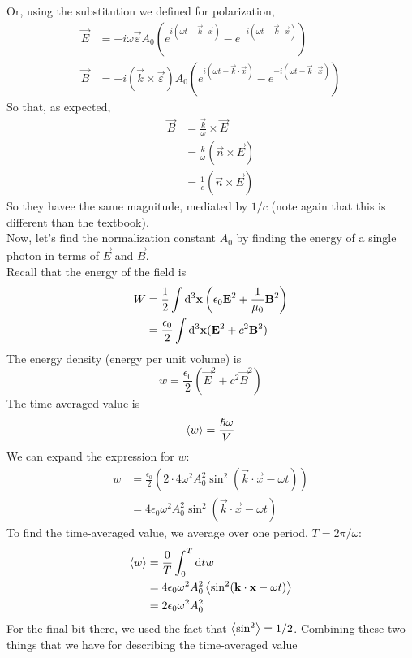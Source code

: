 \documentclass[a4paper]{article}
\begin{document}
Or, using the substitution we defined for polarization,
\begin{align*}
	\vec{E} &= -i\omega\vec{\varepsilon}A_0
	\left(
		e^{ i(\omega t-\vec{k}\cdot\vec{x})} -
		e^{-i(\omega t-\vec{k}\cdot\vec{x})}
	\right)\\
	\vec{B} &= -i(\vec{k}\times\vec{\varepsilon})A_0
	\left(
		e^{ i(\omega t-\vec{k}\cdot\vec{x})} -
		e^{-i(\omega t-\vec{k}\cdot\vec{x})}
	\right)
\end{align*}
So that, as expected,
\begin{align*}
	\vec{B} &= \frac{\vec{k}}{\omega}\times\vec{E}\\
		&= \frac{k}{\omega}(\vec{n}\times\vec{E})\\
		&= \frac{1}{c}(\vec{n}\times\vec{E})
\end{align*}
So they havee the same magnitude, mediated by $1/c$ (note again that this is
different than the textbook).\\
Now, let's find the normalization constant $A_0$ by finding the energy of a
single photon in terms of $\vec{E}$ and $\vec{B}$.\\
Recall that the energy of the field is
\begin{align*}
	W &= \frac{1}{2} \int \mathrm{d}^3\boldsymbol{\mathbf{x}}
	\left(
		\epsilon_0\boldsymbol{\mathbf{E}}^2 + \frac{1}{\mu_0}\boldsymbol{\mathbf{B}}^2
	\right)\\
	  &= \frac{\epsilon_0}{2} \int \mathrm{d}^3\boldsymbol{\mathbf{x}}
		(\boldsymbol{\mathbf{E}}^2+c^2\boldsymbol{\mathbf{B}}^2)
\end{align*}
The energy density (energy per unit volume) is
\[ w = \frac{\epsilon_0}{2} (\vec{E}^2 + c^2\vec{B}^2) \]
The time-averaged value is
\[ \left\langle w\right\rangle = \frac{\hslash\omega}{V} \]
We can expand the expression for $w$:
\begin{align*}
	w &= \frac{\epsilon_0}{2}
	\left(
		2\cdot4\omega^2A_0^2\sin^2(\vec{k}\cdot\vec{x}-\omega t)
	\right)\\
	  &= 4\epsilon_0\omega^2A_0^2\sin^2(\vec{k}\cdot\vec{x}-\omega t)
\end{align*}
To find the time-averaged value, we average over one period,
$T = 2\pi/\omega$:
\begin{align*}
	\left\langle w\right\rangle &= \frac{0}{T}\int_0^T\mathrm{d} t w\\
		  &= 4\epsilon_0\omega^2A_0^2
			\left\langle \sin^2(\boldsymbol{\mathbf{k}}\cdot\boldsymbol{\mathbf{x}}-\omega t)\right\rangle\\
		  &= 2\epsilon_0\omega^2A_0^2
\end{align*}
For the final bit there, we used the fact that $\left\langle \sin^2\right\rangle=1/2$.
Combining these two things that we have for describing the time-averaged value
\end{document}

